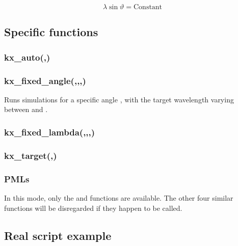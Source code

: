 	\fwarn
	\cite{Aminian:06}
	\begin{equation}
		\lambda\sin\vartheta=\textrm{Constant}
	\end{equation}

\subsection{Specific functions}

\subsubsection[kx\_auto]{kx\_auto(,)}

\subsubsection[kx\_fixed\_angle]{kx\_fixed\_angle(,,,)}

Runs  simulations for a specific angle , with the target wavelength varying between  and .

\subsubsection[kx\_fixed\_lambda]{kx\_fixed\_lambda(,,,)}

\fwarn

\subsubsection[kx\_target]{kx\_target(,)}

	\fwarn

\subsubsection{PMLs}

In this mode, only the  and  functions are available. The other four similar functions will be disregarded if they happen to be called.

\subsection{Real script example}

